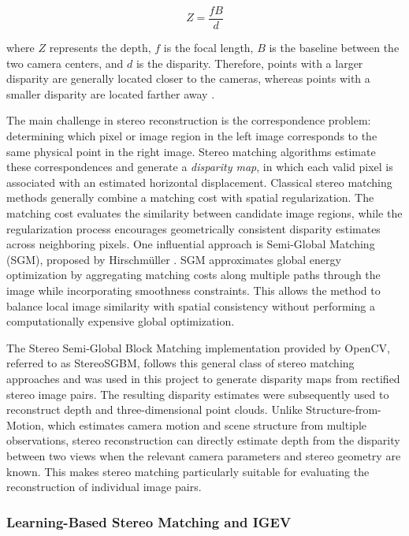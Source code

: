 \begin{equation}
Z = \frac{fB}{d}
\label{eq:depth_from_disparity}
\end{equation}

where \(Z\) represents the depth, \(f\) is the focal length, \(B\) is the baseline between the two camera centers, and \(d\) is the disparity. Therefore, points with a larger disparity are generally located closer to the cameras, whereas points with a smaller disparity are located farther away \cite{opencv_depth_map_stereo, opencv_camera_calibration}.

The main challenge in stereo reconstruction is the correspondence problem: determining which pixel or image region in the left image corresponds to the same physical point in the right image. Stereo matching algorithms estimate these correspondences and generate a \textit{disparity map}, in which each valid pixel is associated with an estimated horizontal displacement. Classical stereo matching methods generally combine a matching cost with spatial regularization. The matching cost evaluates the similarity between candidate image regions, while the regularization process encourages geometrically consistent disparity estimates across neighboring pixels. One influential approach is Semi-Global Matching (SGM), proposed by Hirschmüller \cite{hirschmuller_stereo_2008}. SGM approximates global energy optimization by aggregating matching costs along multiple paths through the image while incorporating smoothness constraints. This allows the method to balance local image similarity with spatial consistency without performing a computationally expensive global optimization.

The Stereo Semi-Global Block Matching implementation provided by OpenCV, referred to as StereoSGBM, follows this general class of stereo matching approaches and was used in this project to generate disparity maps from rectified stereo image pairs. The resulting disparity estimates were subsequently used to reconstruct depth and three-dimensional point clouds. Unlike Structure-from-Motion, which estimates camera motion and scene structure from multiple observations, stereo reconstruction can directly estimate depth from the disparity between two views when the relevant camera parameters and stereo geometry are known. This makes stereo matching particularly suitable for evaluating the reconstruction of individual image pairs.

\subsubsection{Learning-Based Stereo Matching and IGEV}

